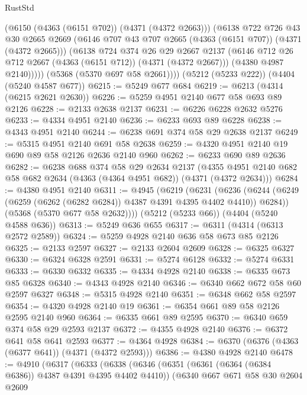 \begin{lexlean}{RustStd}
\begin{coremodule}
{\begin{coremodule}
{{{{{{{{{{{{{{{{            (@6150 (@4363 (@6151 @702)) (@4371 (@4372 @2663)))
            (@6138
              @722
              @726
              @43
              @30
              @2665
              @2669
              (@6146 @707 @43 @707 @2665 (@4363 (@6151 @707)) (@4371 (@4372 @2665)))
              (@6138
                @724
                @374
                @26
                @29
                @2667
                @2137
                (@6146 @712 @26 @712 @2667 (@4363 (@6151 @712)) (@4371 (@4372 @2667)))
                (@4380 @4987 @2140)))))
        (@5368 (@5370 @697 @58 @2661))))
    (@5212 (@5233 @222))
    (@4404 (@5240 @4587 @677))
@6215 := @5249 @677 @684
@6219 := @6213 (@4314 (@6215 @2621 @2630))
@6226 := @5259 @4951 @2140 @677 @58 @693 @89 @2126
@6228 := @2133 @2638 @2137
@6231 := @6226 @6228 @2632 @5276
@6233 := @4334 @4951 @2140
@6236 := @6233 @693 @89 @6228
@6238 := @4343 @4951 @2140
@6244 := @6238 @691 @374 @58 @29 @2638 @2137
@6249 := @5315 @4951 @2140 @691 @58 @2638
@6259 := @4320 @4951 @2140 @19 @690 @89 @58 @2126 @2636 @2140 @960
@6262 := @6233 @690 @89 @2636
@6282 := @6238
    @688
    @374
    @58
    @29
    @2634
    @2137
    (@4355 @4951 @2140 @682 @58 @682 @2634 (@4363 (@4364 @4951 @682)) (@4371 (@4372 @2634)))
@6284 := @4380 @4951 @2140
@6311 := @4945
    (@6219
      (@6231
        (@6236 (@6244 (@6249 (@6259 (@6262 (@6282 @6284)) @4387 @4391 @4395 @4402 @4410)) @6284))
        (@5368 (@5370 @677 @58 @2632))))
    (@5212 (@5233 @66))
    (@4404 (@5240 @4588 @636))
@6313 := @5249 @636 @655
@6317 := @6311 (@4314 (@6313 @2572 @2589))
@6324 := @5259 @4928 @2140 @636 @58 @673 @85 @2126
@6325 := @2133 @2597
@6327 := @2133 @2604 @2609
@6328 := @6325 @6327
@6330 := @6324 @6328 @2591
@6331 := @5274 @6128
@6332 := @5274 @6331
@6333 := @6330 @6332
@6335 := @4334 @4928 @2140
@6338 := @6335 @673 @85 @6328
@6340 := @4343 @4928 @2140
@6346 := @6340 @662 @672 @58 @60 @2597 @6327
@6348 := @5315 @4928 @2140
@6351 := @6348 @662 @58 @2597
@6354 := @4320 @4928 @2140 @19
@6361 := @6354 @661 @89 @58 @2126 @2595 @2140 @960
@6364 := @6335 @661 @89 @2595
@6370 := @6340 @659 @374 @58 @29 @2593 @2137
@6372 := @4355 @4928 @2140
@6376 := @6372 @641 @58 @641 @2593
@6377 := @4364 @4928
@6384 := @6370 (@6376 (@4363 (@6377 @641)) (@4371 (@4372 @2593)))
@6386 := @4380 @4928 @2140
@6478 := @4910
    (@6317
      (@6333
        (@6338
          (@6346
            (@6351 (@6361 (@6364 (@6384 @6386)) @4387 @4391 @4395 @4402 @4410))
            (@6340
              @667
              @671
              @58
              @30
              @2604
              @2609
}}}}}}}}}}}}}}}}
\end{coremodule}}
\end{coremodule}
\end{lexlean}

